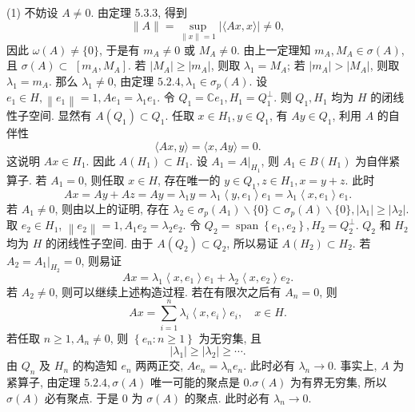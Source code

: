 \documentclass[openany]{ctexbook}
\makeatletter
\theoremstyle{kaiti}
\theoremstyle{normal}
\renewenvironment{proof}[1][\proofname]{\par
    \pushQED{\qed}%
    \normalfont \topsep6\p@\@plus6\p@\relax
    \trivlist
    \item\relax
    {\heiti #1}\hspace{2\labelsep}\ignorespaces
  }{%
    \popQED\endtrivlist\@endpefalse
  }
\makeatother
\begin{document}
\begin{proof}
(1) 不妨设 $A \neq 0$. 由定理 5.3.3, 得到
$$
\|A\|=\sup_{\|x\|=1}|\langle A x, x\rangle| \neq 0,
$$
因此 $\omega(A) \neq\{0\}$, 于是有 $m_{A} \neq 0$ 或 $M_{A} \neq 0$. 由上一定理知 $m_{A}, M_{A} \in \sigma(A)$, 且 $\sigma(A) \subset$ $\left[m_{A}, M_{A}\right]$. 若 $\left|M_{A}\right| \geqslant\left|m_{A}\right|$, 则取 $\lambda_1=M_{A}$; 若 $\left|m_{A}\right|>\left|M_{A}\right|$, 则取 $\lambda_1=m_{A}$. 那么 $\lambda_1 \neq 0$, 由定理 $5.2.4, \lambda_1 \in \sigma_{p}(A)$.
设 $e_1 \in H,\left\|e_1\right\|=1, A e_1=\lambda_1 e_1$. 令 $Q_1=\mathbb{C} e_1, H_1=Q_1^{\perp}$. 则 $Q_1, H_1$ 均为 $H$ 的闭线性子空间. 显然有 $A\left(Q_1\right) \subset Q_1$. 任取 $x \in H_1, y \in Q_1$, 有 $A y \in Q_1$, 利用 $A$ 的自伴性
$$
\langle A x, y\rangle=\langle x, A y\rangle=0.
$$
这说明 $A x \in H_1$. 因此 $A\left(H_1\right) \subset H_1$.
设 $A_1=\left.A\right|_{H_1}$, 则 $A_1 \in B\left(H_1\right)$ 为自伴紧算子. 若 $A_1=0$, 则任取 $x \in H$, 存在唯一的 $y \in Q_1, z \in H_1, x=y+z$. 此时
$$
A x=A y+A z=A y=\lambda_1 y=\lambda_1\left\langle y, e_1\right\rangle e_1=\lambda_1\left\langle x, e_1\right\rangle e_1.
$$
若 $A_1 \neq 0$, 则由以上的证明, 存在 $\lambda_2 \in \sigma_{p}\left(A_1\right) \backslash\{0\} \subset \sigma_{p}(A) \backslash\{0\},\left|\lambda_1\right| \geqslant\left|\lambda_2\right|$. 取 $e_2 \in H_1$, $\left\|e_2\right\|=1, A_1 e_2=\lambda_2 e_2$. 令 $Q_2=\operatorname{span}\left\{e_1, e_2\right\}, H_2=Q_2^{\perp}$. $Q_2$ 和 $H_2$ 均为 $H$ 的闭线性子空间. 由于 $A\left(Q_2\right) \subset Q_2$, 所以易证 $A\left(H_2\right) \subset H_2$. 若 $A_2=\left.A_1\right|_{H_2}=0$, 则易证
$$
A x=\lambda_1\left\langle x, e_1\right\rangle e_1+\lambda_2\left\langle x, e_2\right\rangle e_2.
$$
若 $A_2 \neq 0$, 则可以继续上述构造过程.
若在有限次之后有 $A_n=0$, 则
$$
A x=\sum_{i=1}^n \lambda_{i}\left\langle x, e_{i}\right\rangle e_{i}, \quad x \in H.
$$
若任取 $n \geqslant 1, A_n \neq 0$, 则 $\left\{e_n: n \geqslant 1\right\}$ 为无穷集, 且
$$
\left|\lambda_1\right| \geqslant\left|\lambda_2\right| \geqslant \cdots.
$$
由 $Q_n$ 及 $H_n$ 的构造知 $e_n$ 两两正交, $A e_n=\lambda_n e_n$. 此时必有 $\lambda_n \rightarrow 0$. 事实上, $A$ 为紧算子, 由定理 $5.2.4, \sigma(A)$ 唯一可能的聚点是 $0. \sigma(A)$ 为有界无穷集, 所以 $\sigma(A)$ 必有聚点. 于是 0 为 $\sigma(A)$ 的聚点. 此时必有 $\lambda_n \rightarrow 0$.


\end{proof}
\end{document}
